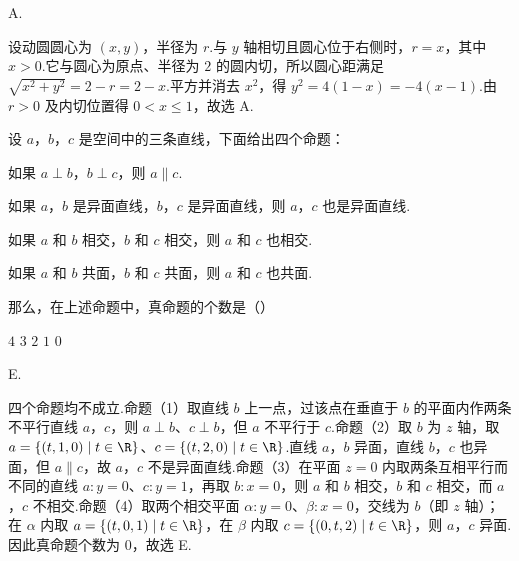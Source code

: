 \documentclass[UTF8,a4paper,oneside,11pt]{ctexbook}
\begin{document}
\begin{answer}
A.
\end{answer}

\begin{solution}
设动圆圆心为 \((x,y)\)，半径为 \(r\).与 \(y\) 轴相切且圆心位于右侧时，\(r=x\)，其中 \(x>0\).它与圆心为原点、半径为 \(2\) 的圆内切，所以圆心距满足 \(\sqrt{x^2+y^2}=2-r=2-x\).平方并消去 \(x^2\)，得 \(y^2=4(1-x)=-4(x-1)\).由 \(r>0\) 及内切位置得 \(0<x\leqslant1\)，故选 A.
\end{solution}

\begin{problem}

设 \(a\)，\(b\)，\(c\) 是空间中的三条直线，下面给出四个命题：

\begin{circlelist}
\item 如果 \(a \perp b\)，\(b \perp c\)，则 \(a \parallel c\).
\item 如果 \(a\)，\(b\) 是异面直线，\(b\)，\(c\) 是异面直线，则 \(a\)，\(c\) 也是异面直线.
\item 如果 \(a\) 和 \(b\) 相交，\(b\) 和 \(c\) 相交，则 \(a\) 和 \(c\) 也相交.
\item 如果 \(a\) 和 \(b\) 共面，\(b\) 和 \(c\) 共面，则 \(a\) 和 \(c\) 也共面.
\end{circlelist}

那么，在上述命题中，真命题的个数是（\quad）

\choicesfive
    {\(4\)}
    {\(3\)}
    {\(2\)}
    {\(1\)}
    {\(0\)}
\end{problem}

\begin{answer}
E.
\end{answer}

\begin{solution}
四个命题均不成立.命题（1）取直线 \(b\) 上一点，过该点在垂直于 \(b\) 的平面内作两条不平行直线 \(a\)，\(c\)，则 \(a\perp b\)、\(c\perp b\)，但 \(a\) 不平行于 \(c\).命题（2）取 \(b\) 为 \(z\) 轴，取 \(a=\{(t,1,0)\mid t\in\R\}\)、\(c=\{(t,2,0)\mid t\in\R\}\).直线 \(a\)，\(b\) 异面，直线 \(b\)，\(c\) 也异面，但 \(a\parallel c\)，故 \(a\)，\(c\) 不是异面直线.命题（3）在平面 \(z=0\) 内取两条互相平行而不同的直线 \(a:y=0\)、\(c:y=1\)，再取 \(b:x=0\)，则 \(a\) 和 \(b\) 相交，\(b\) 和 \(c\) 相交，而 \(a\)，\(c\) 不相交.命题（4）取两个相交平面 \(\alpha:y=0\)、\(\beta:x=0\)，交线为 \(b\)（即 \(z\) 轴）；在 \(\alpha\) 内取 \(a=\{(t,0,1)\mid t\in\R\}\)，在 \(\beta\) 内取 \(c=\{(0,t,2)\mid t\in\R\}\)，则 \(a\)，\(c\) 异面.因此真命题个数为 \(0\)，故选 E.
\end{solution}
\end{document}
